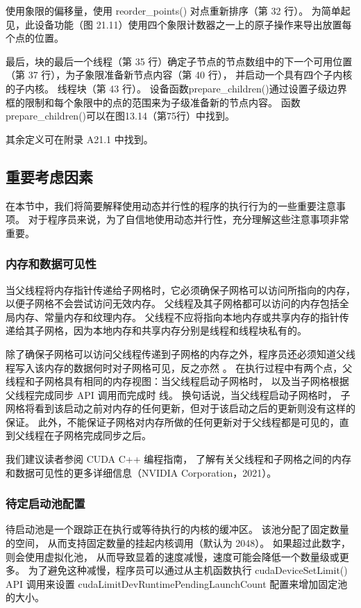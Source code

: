 使用象限的偏移量，使用 reorder\_points() 对点重新排序（第 32 行）。 
为简单起见，此设备功能（图 21.11）使用四个象限计数器之一上的原子操作来导出放置每个点的位置。

最后，块的最后一个线程（第 35 行）确定子节点的节点数组中的下一个可用位置（第 37 行），为子象限准备新节点内容（第 40 行），
并启动一个具有四个子内核的子内核。 线程块（第 43 行）。 
设备函数prepare\_children()通过设置子级边界框的限制和每个象限中的点的范围来为子级准备新的节点内容。 
函数prepare\_children()可以在图13.14（第75行）中找到。

其余定义可在附录 A21.1 中找到。

\subsection{重要考虑因素}
在本节中，我们将简要解释使用动态并行性的程序的执行行为的一些重要注意事项。 
对于程序员来说，为了自信地使用动态并行性，充分理解这些注意事项非常重要。

\subsubsection{内存和数据可见性}
当父线程将内存指针传递给子网格时，它必须确保子网格可以访问所指向的内存，以便子网格不会尝试访问无效内存。 
父线程及其子网格都可以访问的内存包括全局内存、常量内存和纹理内存。 
父线程不应将指向本地内存或共享内存的指针传递给其子网格，因为本地内存和共享内存分别是线程和线程块私有的。

除了确保子网格可以访问父线程传递到子网格的内存之外，程序员还必须知道父线程写入该内存的数据何时对子网格可见，反之亦然 。 
在执行过程中有两个点，父线程和子网格具有相同的内存视图：当父线程启动子网格时，
以及当子网格根据父线程完成同步 API 调用而完成时 线。 换句话说，当父线程启动子网格时，
子网格将看到该启动之前对内存的任何更新，但对于该启动之后的更新则没有这样的保证。 
此外，不能保证子网格对内存所做的任何更新对于父线程都是可见的，直到父线程在子网格完成同步之后。

我们建议读者参阅 CUDA C++ 编程指南，
了解有关父线程和子网格之间的内存和数据可见性的更多详细信息（NVIDIA Corporation，2021）。

\subsubsection{待定启动池配置}
待启动池是一个跟踪正在执行或等待执行的内核的缓冲区。 该池分配了固定数量的空间，
从而支持固定数量的挂起内核调用（默认为 2048）。 如果超过此数字，则会使用虚拟化池，
从而导致显着的速度减慢，速度可能会降低一个数量级或更多。 
为了避免这种减慢，程序员可以通过从主机函数执行 cudaDeviceSetLimit() API 调用来设置 cudaLimitDevRuntimePendingLaunchCount 配置来增加固定池的大小。

